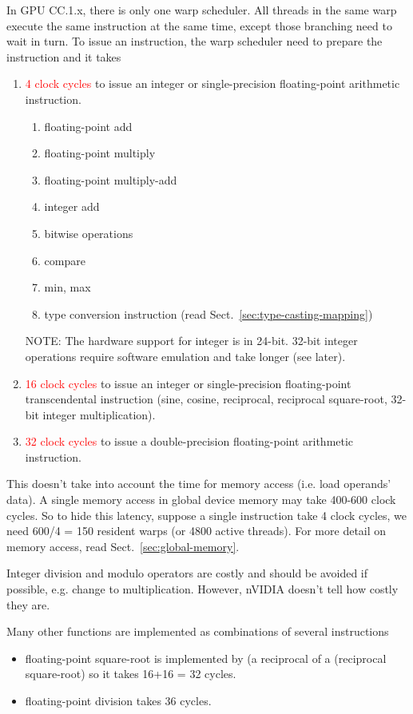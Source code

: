 In GPU CC.1.x, there is only one warp scheduler. All threads in the
same warp execute the same instruction at the same time, except those
branching need to wait in turn.  To issue an instruction, the warp
scheduler need to prepare the instruction and it takes
\begin{enumerate}
\item \textcolor{red}{4 clock cycles} to issue an integer or
  single-precision floating-point arithmetic instruction.
  \begin{enumerate}
  \item floating-point add
  \item floating-point multiply
  \item floating-point multiply-add
  \item integer add
  \item bitwise operations
  \item compare
  \item min, max
  \item type conversion instruction (read
    Sect.~\ref{sec:type-casting-mapping}) 
  \end{enumerate}
  NOTE: The hardware support for integer is in 24-bit. 32-bit integer
  operations require software emulation and take longer (see later). 


\item \textcolor{red}{16 clock cycles} to issue an integer or
  single-precision floating-point transcendental instruction (sine,
  cosine, reciprocal, reciprocal square-root, 32-bit integer
  multiplication).

\item \textcolor{red}{32 clock cycles} to issue a double-precision
  floating-point arithmetic instruction.
\end{enumerate}
This doesn't take into account the time for memory access (i.e. load
operands' data). A single memory access in global device memory may
take 400-600 clock cycles. So to hide this latency, suppose a single
instruction take 4 clock cycles, we need 600/4 = 150 resident warps
(or 4800 active threads). For more detail on memory access, read
Sect.~\ref{sec:global-memory}. 

\begin{framed}
  Integer division and modulo operators are costly and should be
  avoided if possible, e.g. change to multiplication. However, nVIDIA
  doesn't tell how costly they are. 

  Many other functions are implemented as combinations of several
  instructions
  \begin{itemize}
  \item floating-point square-root is implemented by (a
    reciprocal of a (reciprocal square-root) so it takes 16+16 = 32
    cycles. 
  \item floating-point division takes 36 cycles. 
  \end{itemize}
\end{framed}

